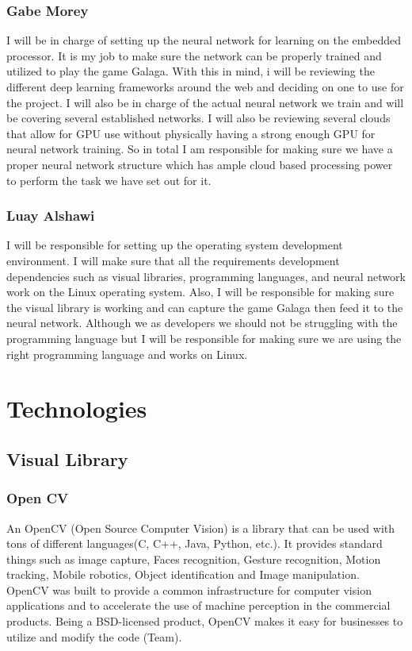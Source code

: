 \documentclass{scrreprt}
\begin{document}
\subsection{Gabe Morey}
I will be in charge of setting up the neural network for learning on the embedded processor. It is
my job to make sure the network can be properly trained and utilized to play the game Galaga.
With this in mind, i will be reviewing the different deep learning frameworks around the web
and deciding on one to use for the project. I will also be in charge of the actual neural network
we train and will be covering several established networks. I will also be reviewing several
clouds that allow for GPU use without physically having a strong enough GPU for neural
network training. So in total I am responsible for making sure we have a proper neural network
structure which has ample cloud based processing power to perform the task we have set out for
it.

\subsection{Luay Alshawi}
I will be responsible for setting up the operating system development environment. 
I will make sure that all the requirements development dependencies such as visual libraries, programming languages, and neural network work on the Linux operating system. 
Also, I will be responsible for making sure the visual library is working and can capture the game Galaga then feed it to the neural network. 
Although we as developers we should not be struggling with the programming language but I will be responsible for making sure we are using the right programming language and works on Linux.

\chapter{Technologies}
\section{Visual Library}
\subsection{Open CV}
An OpenCV (Open Source Computer Vision) is a library that can be used with tons of different languages(C, C++, Java, Python, etc.).
 It provides standard things such as image capture, Faces recognition, Gesture recognition, Motion tracking, Mobile robotics, Object identification and Image manipulation.
 OpenCV was built to provide a common infrastructure for computer vision applications and to accelerate the use of machine perception in the commercial products.
 Being a BSD-licensed product, OpenCV makes it easy for businesses to utilize and modify the code (Team).
\end{document}

